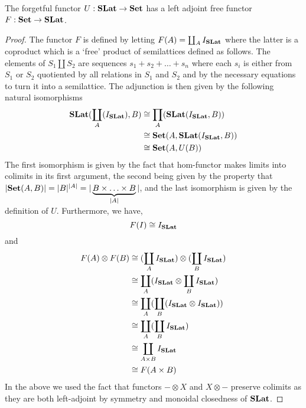     \begin{proposition}
      The forgetful functor $U : \mathbf{SLat} \to \mathbf{Set}$ has a left adjoint free functor $F : \mathbf{Set} \to \mathbf{SLat}$.
    \end{proposition}
    \begin{proof}
      The functor $F$ is defined by letting $F(A) = \coprod_{A} I_{\mathbf{SLat}}$ where the latter is a coproduct which is a `free' product of semilattices defined as follows.
      The elements of $S_{1} \coprod S_{2}$ are sequences $s_{1} + s_{2} + \ldots + s_{n}$ where each $s_{i}$ is either from $S_{1}$ or $S_{2}$ quotiented by all relations in $S_{1}$ and $S_{2}$ and by the necessary equations to turn it into a semilattice.
      The adjunction is then given by the following natural isomorphisms
      \begin{align*}
      \mathbf{SLat}(\coprod_{A}(I_{\mathbf{SLat}}), B) &\cong \prod_{A}(\mathbf{SLat}(I_{\mathbf{SLat}}, B))\\
                                                         &\cong \mathbf{Set}(A,\mathbf{SLat}(I_{\mathbf{SLat}}, B))\\
                                                         &\cong \mathbf{Set}(A, U(B))
      \end{align*}
      The first isomorphism is given by the fact that hom-functor makes limits into colimits in its first argument, the second being given by the property that $|\mathbf{Set}(A,B)| = |B|^{|A|} = |\underbrace{B \times \ldots \times B}_{|A|}|$, and the last isomorphism is given by the definition of $U$.
      Furthermore, we have, 
      \[
      F(I) \cong I_{\mathbf{SLat}}
      \]
      and 
      \begin{align*}
      F(A) \otimes F(B) &\cong (\coprod_{A} I_{\mathbf{SLat}}) \otimes (\coprod_{B} I_{\mathbf{SLat}})\\
            &\cong \coprod_{A} (I_{\mathbf{SLat}} \otimes \coprod_{B} I_{\mathbf{SLat}})\\
            &\cong \coprod_{A} (\coprod_{B} (I_{\mathbf{SLat}} \otimes I_{\mathbf{SLat}}))\\
            &\cong \coprod_{A} (\coprod_{B} I_{\mathbf{SLat}})\\
            &\cong \coprod_{A \times B} I_{\mathbf{SLat}}\\
            &\cong F(A \times B)
      \end{align*}
    In the above we used the fact that functors $- \otimes X$ and $X \otimes -$ preserve colimits as they are both left-adjoint by symmetry and monoidal closedness of $\mathbf{SLat}$.
    \end{proof}

